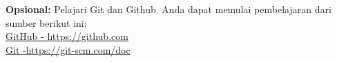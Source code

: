 \begin{center}
	\colorbox{cyan!30}{\parbox{0.8\linewidth}{\textbf{Opsional:} Pelajari Git dan Github. Anda dapat memulai pembelajaran dari sumber berikut ini: \\ \href{https://github.com}{GitHub - https://github.com} \\ \href{https://git-scm.com/doc}{Git -https://git-scm.com/doc}}}
\end{center}